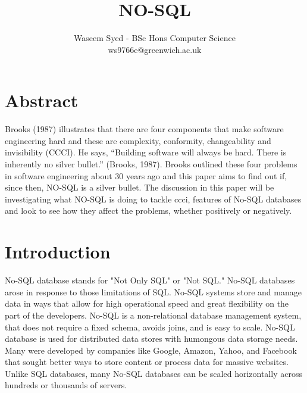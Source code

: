 \documentclass{article} %
\begin{document}
	



\title{NO-SQL} %
\author{Waseem Syed - BSc Hons Computer Science \\
			ws9766e@greenwich.ac.uk} %

\maketitle %



{
	\centering


} %




\section{Abstract}
Brooks (1987) illustrates that there are four components that make software engineering 
hard and these are  complexity, conformity, changeability and invisibility (CCCI). 
He says, “Building software will always be hard. There is inherently no silver bullet.” (Brooks, 1987).  
Brooks outlined these four problems in software engineering about  30 years ago and this 
paper aims to find out if, since then, NO-SQL is a silver bullet. The discussion in this paper will be 
investigating what NO-SQL is doing to tackle \gls{ccci}, features
of No-SQL databases and look to see how they affect the problems, whether positively or negatively.

\section{Introduction}
No-SQL database stands for "Not Only SQL" or "Not SQL." 
No-SQL databases arose in response to those limitations of SQL. No-SQL systems store and manage data in 
ways that allow for high operational speed and great flexibility on the part of the developers. 
No-SQL is a non-relational database management system, that does not require a fixed schema, avoids joins, and is easy to scale. No-SQL database is used for distributed data stores with humongous data storage needs. 
Many were developed by companies like Google, Amazon, Yahoo, and Facebook that sought better ways to store content or process data for massive websites. Unlike SQL databases, many No-SQL databases can be scaled horizontally across hundreds or thousands of servers. 
\end{document}

